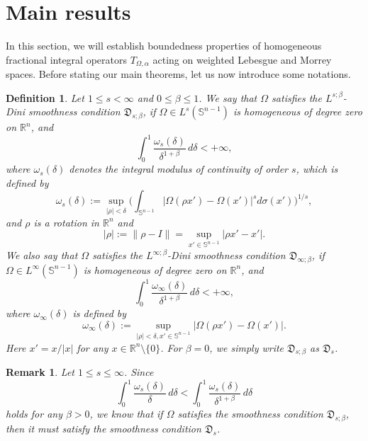 \documentclass[preprint,10pt]{elsarticle}
\newtheorem{defin}[thm]{Definition}
\newtheorem{rem}[thm]{Remark}
\numberwithin{equation}{section}
\begin{document}
\section{Main results}
\label{sec2}
In this section, we will establish boundedness properties of homogeneous fractional integral operators $T_{\Omega,\alpha}$ acting on weighted Lebesgue and Morrey spaces. Before stating our main theorems, let us now introduce some notations.
\begin{defin}\label{defd}
Let $1\leq s<\infty$ and $0\leq\beta\leq1$. We say that $\Omega$ satisfies the $L^{s;\beta}$-Dini smoothness condition $\mathfrak{D}_{s;\beta}$, if $\Omega\in L^s(\mathbb{S}^{n-1})$ is homogeneous of degree zero on $\mathbb R^n$, and
\begin{equation*}
\int_0^1\frac{\omega_s(\delta)}{\delta^{1+\beta}}\,d\delta<+\infty,
\end{equation*}
where $\omega_s(\delta)$ denotes the integral modulus of continuity of order $s$, which is defined by
\begin{equation}\label{964}
\omega_s(\delta):=\sup_{|\rho|<\delta}\bigg(\int_{\mathbb{S}^{n-1}}\big|\Omega(\rho x')-\Omega(x')\big|^sd\sigma(x')\bigg)^{1/s},
\end{equation}
and $\rho$ is a rotation in $\mathbb R^n$ and
\begin{equation*}
|\rho|:=\|\rho-I\|=\sup_{x'\in\mathbb{S}^{n-1}}\big|\rho x'-x'\big|.
\end{equation*}
We also say that $\Omega$ satisfies the $L^{\infty;\beta}$-Dini smoothness condition $\mathfrak{D}_{\infty;\beta}$, if $\Omega\in L^{\infty}(\mathbb{S}^{n-1})$ is homogeneous of degree zero on $\mathbb R^n$, and
\begin{equation*}
\int_0^1\frac{\omega_{\infty}(\delta)}{\delta^{1+\beta}}\,d\delta<+\infty,
\end{equation*}
where $\omega_{\infty}(\delta)$ is defined by
\begin{equation}\label{965}
\omega_{\infty}(\delta):=\sup_{|\rho|<\delta,x'\in \mathbb{S}^{n-1}}\big|\Omega(\rho x')-\Omega(x')\big|.
\end{equation}
Here $x'=x/{|x|}$ for any $x\in \mathbb R^n\setminus\{0\}$. For $\beta=0$, we simply write $\mathfrak{D}_{s;\beta}$ as $\mathfrak{D}_{s}$.
\end{defin}

\begin{rem}\label{remark10}
Let $1\leq s\leq\infty$. Since
\begin{equation*}
\int_0^1\frac{\omega_s(\delta)}{\delta}\,d\delta<\int_0^1\frac{\omega_s(\delta)}{\delta^{1+\beta}}\,d\delta
\end{equation*}
holds for any $\beta>0$, we know that if $\Omega$ satisfies the smoothness condition $\mathfrak{D}_{s;\beta}$, then it must satisfy the smoothness condition $\mathfrak{D}_{s}$.
\end{rem}
\end{document}
